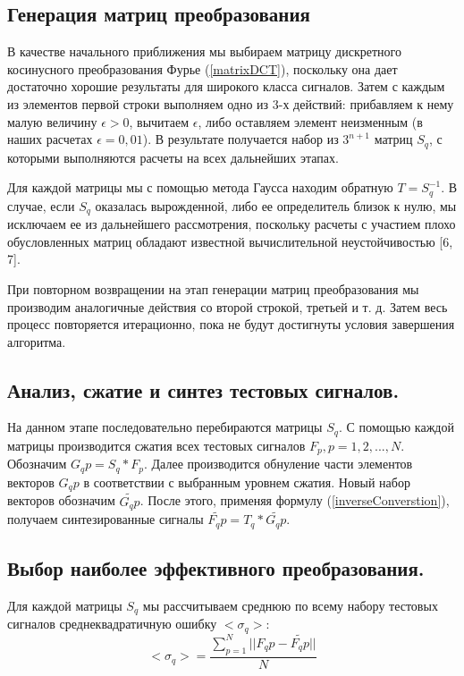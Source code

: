 \documentclass[11pt, oneside, a4paper]{article}
\begin{document}
\subsection{Генерация матриц преобразования}

В качестве начального приближения мы выбираем матрицу дискретного косинусного преобразования Фурье (\ref{matrixDCT}), поскольку она дает достаточно хорошие результаты для широкого класса сигналов. Затем с каждым из элементов первой строки выполняем одно из 3-х действий: прибавляем к нему малую величину $\epsilon>0$, вычитаем $\epsilon$, либо оставляем элемент неизменным (в наших расчетах $\epsilon=0,01$). В результате получается набор из $3^{n+1}$ матриц $S_q$, с которыми выполняются расчеты на всех дальнейших этапах.

Для каждой матрицы мы с помощью метода Гаусса находим обратную $T=S_q^{-1}$. В случае, если $S_q$ оказалась вырожденной, либо ее определитель близок к нулю, мы исключаем ее из дальнейшего рассмотрения, поскольку расчеты с участием плохо обусловленных матриц обладают известной вычислительной неустойчивостью [6, 7].

При повторном возвращении на этап генерации матриц преобразования мы производим аналогичные действия со второй строкой, третьей и т. д. Затем весь процесс повторяется итерационно, пока не будут достигнуты условия завершения алгоритма. 

\subsection{Анализ, сжатие и синтез тестовых сигналов.}

На данном этапе последовательно перебираются матрицы $S_q$. С помощью каждой матрицы производится сжатия всех тестовых сигналов $F_p, p=1,2,...,N$. Обозначим $G_qp=S_q*F_p$. Далее производится обнуление части элементов векторов $G_qp$ в соответствии с выбранным уровнем сжатия. Новый набор векторов обозначим $\tilde{G_qp}$. После этого, применяя формулу (\ref{inverseConverstion}), получаем синтезированные сигналы $\tilde{F_qp}=T_q*\tilde{G_qp}$.

\subsection{Выбор наиболее эффективного преобразования.}

Для каждой матрицы $S_q$ мы рассчитываем среднюю по всему набору тестовых сигналов среднеквадратичную ошибку $<\sigma_q>$:
\begin{equation}
\label{squareNormQ}
    <\sigma_q> = \frac{\sum\limits_{p=1}^{N}||F_qp-\tilde{F_qp}||}{N}
\end{equation}
\end{document}
